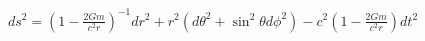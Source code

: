 \documentclass[preview]{standalone}
\begin{document}
\begin{align*}
ds^{2}=\left(1-{\frac {2Gm}{c^{2}r}}\right)^{-1}dr^{2}+r^{2}(d\theta ^{2}+\sin ^{2}\theta d\phi ^{2})-c^{2}\left(1-{\frac {2Gm}{c^{2}r}}\right)dt^{2}
\end{align*}
\end{document}
